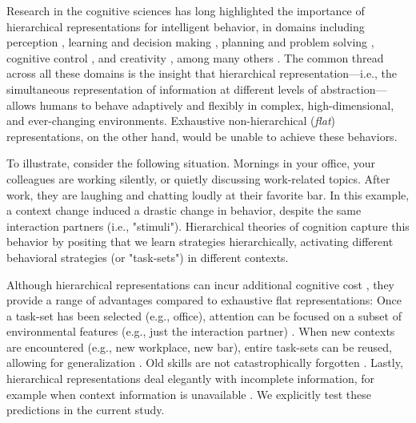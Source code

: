 \documentclass[10pt,letterpaper]{article}  %
\newcommand{\rev}{\color{black}}
\begin{document}
Research in the cognitive sciences has long highlighted the importance of hierarchical representations for intelligent behavior, in domains including perception \cite{lee_hierarchical_2003}, learning and decision making \cite{botvinick_reinforcement_2015, botvinick_hierarchically_2009}, planning and problem solving \cite{chase_perception_1973}, cognitive control \cite{miller_integrative_2001}, and creativity \cite{collins_reasoning_2012}, among many others \cite{tenenbaum_how_2011, griffiths_doing_2019}. %
The common thread across all these domains is the insight that hierarchical representation---i.e., the simultaneous representation of information at different levels of abstraction---allows humans to behave adaptively and flexibly in complex, high-dimensional, and ever-changing environments. {\rev Exhaustive non-hierarchical (\textit{flat}) representations, on the other hand, would be unable to achieve these behaviors.} %

To illustrate, consider the following situation. Mornings in your office, your colleagues are working silently, or quietly discussing work-related topics. After work, they are laughing and chatting loudly at their favorite bar. In this example, a context change induced a drastic change in behavior, despite the same interaction partners (i.e., "stimuli"). Hierarchical theories of cognition capture this behavior by positing that we learn strategies hierarchically, activating different behavioral strategies (or "task-sets") in different contexts.

Although hierarchical representations can incur additional cognitive cost \cite{collins_cost_2017}, they provide a range of advantages compared to exhaustive flat representations: Once a task-set has been selected (e.g., office), attention can be focused on a subset of environmental features (e.g., just the interaction partner) \cite{frank_mechanisms_2012, niv_reinforcement_2015, leong_dynamic_2017, wilson_inferring_2012}. When new contexts are encountered (e.g., new workplace, new bar), entire task-sets can be reused, allowing for generalization \cite{collins_reasoning_2012, donoso_foundations_2014, taatgen_nature_2013}. Old skills are not catastrophically forgotten \cite{flesch_comparing_2018}. Lastly, hierarchical representations deal elegantly with incomplete information, for example when context information is unavailable \cite{collins_reasoning_2012, collins_cognitive_2013}. {\rev We explicitly test these predictions in the current study.}
\end{document}

